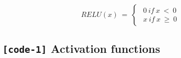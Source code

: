 \documentclass[11pt, twoside]{article}
\begin{document}
\begin{equation*}
    RELU(x)\ =\
    \begin{cases}
        \begin{aligned}
            0\ if\ x\ <   \ 0\\
            x\ if\ x\ \geq\ 0  
        \end{aligned}
    \end{cases}
\end{equation*}

    \hypertarget{code-1-activation-functions}{%
\subsection{\texorpdfstring{\texttt{{[}code-1{]}} Activation
functions}{{[}code-1{]} Activation functions}}\label{code-1-activation-functions}}
\end{document}
